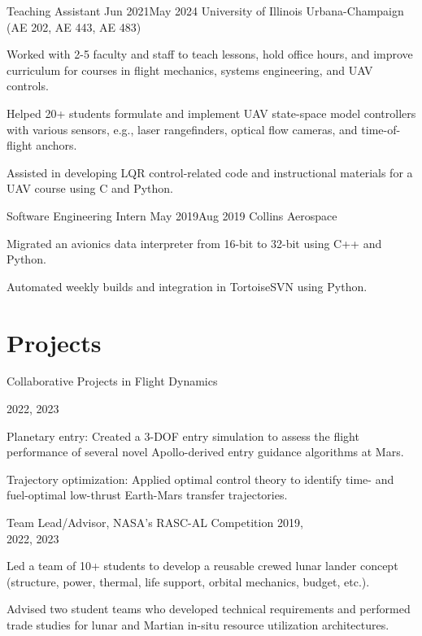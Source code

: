 \documentclass[letterpaper,12pt]{article}
\begin{document}
	\begin{WorkExperience}
		{Teaching Assistant}
		{Jun 2021}{May 2024}
		{University of Illinois Urbana-Champaign (AE 202, AE 443, AE 483)}
			\item Worked with 2-5 faculty and staff to teach lessons, hold office hours, and improve curriculum for courses in flight mechanics, systems engineering, and UAV controls.
			\item Helped 20+ students formulate and implement UAV state-space model controllers with various sensors, e.g., laser rangefinders, optical flow cameras, and time-of-flight anchors.
			\item Assisted in developing LQR control-related code and instructional materials for a UAV course using C and Python.
	\end{WorkExperience}

	\begin{WorkExperience}
		{Software Engineering Intern}
		{May 2019}{Aug 2019}
		{Collins Aerospace}
			\item Migrated an avionics data interpreter from 16-bit to 32-bit using C++ and Python.
			\item Automated weekly builds and integration in TortoiseSVN using Python.
	\end{WorkExperience}
	

	

	\section{Projects}

	\begin{ProjectExperience}
		{Collaborative Projects in Flight Dynamics}
		{2022, 2023\\\strut}
			\item Planetary entry: Created a 3-DOF entry simulation to assess the flight performance of several novel Apollo-derived entry guidance algorithms at Mars.
			\item Trajectory optimization: Applied optimal control theory to identify time- and fuel-optimal low-thrust Earth-Mars transfer trajectories. 
	\end{ProjectExperience}

	\begin{ProjectExperience}
		{Team Lead/Advisor, NASA's RASC-AL Competition}
		{2019, \\ 2022, 2023}
			\item Led a team of 10+ students to develop a reusable crewed lunar lander concept (structure, power, thermal, life support, orbital mechanics, budget, etc.). 
			\item Advised two student teams who developed technical requirements and performed trade studies for lunar and Martian in-situ resource utilization architectures. 
	\end{ProjectExperience}
\end{document}
